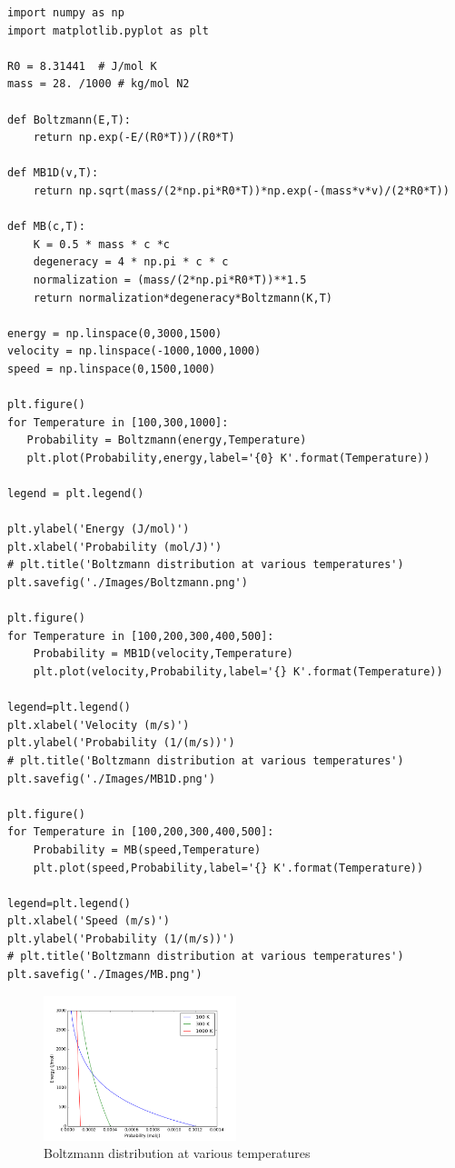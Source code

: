\documentclass[11pt]{article}
\begin{document}
\begin{verbatim}
import numpy as np
import matplotlib.pyplot as plt

R0 = 8.31441  # J/mol K
mass = 28. /1000 # kg/mol N2

def Boltzmann(E,T):
    return np.exp(-E/(R0*T))/(R0*T)

def MB1D(v,T):
    return np.sqrt(mass/(2*np.pi*R0*T))*np.exp(-(mass*v*v)/(2*R0*T))

def MB(c,T):
    K = 0.5 * mass * c *c
    degeneracy = 4 * np.pi * c * c
    normalization = (mass/(2*np.pi*R0*T))**1.5
    return normalization*degeneracy*Boltzmann(K,T)

energy = np.linspace(0,3000,1500)
velocity = np.linspace(-1000,1000,1000)
speed = np.linspace(0,1500,1000)

plt.figure()
for Temperature in [100,300,1000]:
   Probability = Boltzmann(energy,Temperature)
   plt.plot(Probability,energy,label='{0} K'.format(Temperature))

legend = plt.legend()

plt.ylabel('Energy (J/mol)')
plt.xlabel('Probability (mol/J)')
# plt.title('Boltzmann distribution at various temperatures')
plt.savefig('./Images/Boltzmann.png')

plt.figure()
for Temperature in [100,200,300,400,500]:
    Probability = MB1D(velocity,Temperature)
    plt.plot(velocity,Probability,label='{} K'.format(Temperature))

legend=plt.legend()
plt.xlabel('Velocity (m/s)')
plt.ylabel('Probability (1/(m/s))')
# plt.title('Boltzmann distribution at various temperatures')
plt.savefig('./Images/MB1D.png')

plt.figure()
for Temperature in [100,200,300,400,500]:
    Probability = MB(speed,Temperature)
    plt.plot(speed,Probability,label='{} K'.format(Temperature))

legend=plt.legend()
plt.xlabel('Speed (m/s)')
plt.ylabel('Probability (1/(m/s))')
# plt.title('Boltzmann distribution at various temperatures')
plt.savefig('./Images/MB.png')
\end{verbatim}

\begin{figure}[htbp]
\centering
\includegraphics[width=0.5\textwidth]{./Images/Boltzmann.png}
\caption{Boltzmann distribution at various temperatures}
\end{figure}
\end{document}
